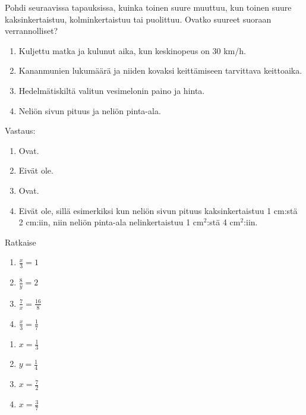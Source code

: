 \begin{tehtava}
    Pohdi seuraavissa tapauksissa, kuinka toinen suure muuttuu, kun toinen suure
    kaksinkertaistuu, kolminkertaistuu tai puolittuu. Ovatko suureet
    suoraan verrannolliset?
    
    \begin{enumerate}
        \item Kuljettu matka ja kulunut aika, kun keskinopeus on 30 km/h.
        \item Kananmunien lukumäärä ja niiden kovaksi keittämiseen tarvittava keittoaika.
        \item Hedelmätiskiltä valitun vesimelonin paino ja hinta.
        \item Neliön sivun pituus ja neliön pinta-ala.
    \end{enumerate}
    
    \begin{vastaus}
        Vastaus:
        \begin{enumerate}
            \item Ovat.
            \item Eivät ole.
            \item Ovat.
            \item Eivät ole, sillä esimerkiksi kun neliön sivun pituus
                kaksinkertaistuu 1 cm:stä 2 cm:iin, niin neliön pinta-ala
                nelinkertaistuu 1 cm$^2$:stä 4 cm$^2$:iin.
        \end{enumerate}
    \end{vastaus}
\end{tehtava}

\begin{tehtava}
Ratkaise
\begin{enumerate}
\item $ \frac{x}{3} = 1$
\item $ \frac{8}{y} = 2$
\item $ \frac{7}{x} = \frac{16}{8}$
\item $ \frac{x}{3} = \frac{1}{7}$
\end{enumerate}
\begin{vastaus}
\begin{enumerate}
\item $x= \frac{1}{3}$
\item $y= \frac{1}{4}$
\item $x= \frac{7}{2}$
\item $x= \frac{3}{7}$
\end{enumerate}
\end{vastaus}
\end{tehtava}

